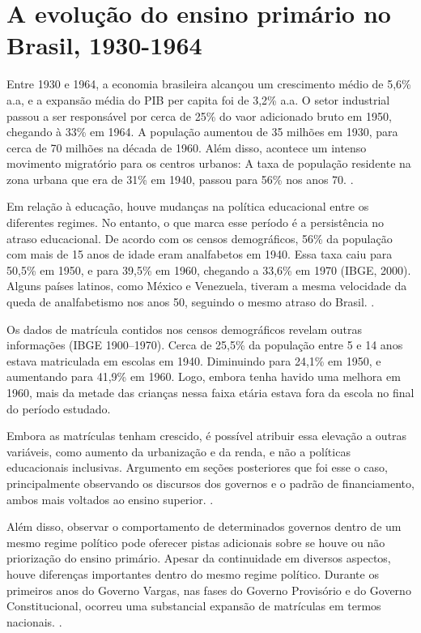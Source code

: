 \documentclass[a4paper,12pt]{article}
\begin{document}
\section*{A evolução do ensino primário no Brasil, 1930-1964}

Entre 1930 e 1964, a economia brasileira alcançou um crescimento médio de 5,6\% a.a, e a expansão média do PIB per capita foi de 3,2\% a.a.
O setor industrial passou a ser responsável por cerca de 25\% do vaor adicionado bruto em 1950, chegando à 33\% em 1964. A população aumentou de 35 milhões em 1930, para cerca de 70 milhões na década de 1960.
Além disso, acontece um intenso movimento migratório para os centros urbanos: A taxa de população residente na zona urbana que era de 31\% em 1940, passou para 56\% nos anos 70. \cite{kang}.

Em relação à educação, houve mudanças na política educacional entre os diferentes regimes. No entanto, o que marca esse período é a persistência no atraso educacional.
De acordo com os censos demográficos, 56\% da população com mais de 15 anos de idade eram analfabetos em 1940.
Essa taxa caiu para 50,5\% em 1950, e para 39,5\% em 1960, chegando a 33,6\% em 1970 (IBGE, 2000).
Alguns países latinos, como México e Venezuela, tiveram a mesma velocidade da queda de analfabetismo nos anos 50, seguindo o mesmo atraso do Brasil. \cite{frankema}.

Os dados de matrícula contidos nos censos demográficos revelam outras informações (IBGE 1900–1970). Cerca de 25,5\% da população entre 5 e 14 anos estava matriculada em escolas em 1940.
Diminuindo para 24,1\% em 1950, e aumentando para 41,9\% em 1960. Logo, embora tenha havido uma melhora em 1960, mais da metade das crianças nessa faixa etária estava fora da escola no final do período estudado.

\begin{citacao}
Embora as matrículas tenham crescido,
é possível atribuir essa elevação a outras variáveis,
como aumento da urbanização e da renda,
e não a políticas educacionais inclusivas.
Argumento em seções posteriores que foi esse o caso,
principalmente observando os discursos dos governos e o padrão de financiamento,
ambos mais voltados ao ensino superior. \cite[p. 38]{kang}.
\end{citacao}

\begin{citacao}
    Além disso,
    observar o comportamento de determinados governos dentro de um mesmo regime político pode oferecer pistas adicionais sobre se houve ou não priorização do ensino primário.
    Apesar da continuidade em diversos aspectos,
    houve diferenças importantes dentro do mesmo regime político.
    Durante os primeiros anos do Governo Vargas,
    nas fases do Governo Provisório e do Governo Constitucional,
    ocorreu uma substancial expansão de matrículas em termos nacionais.
    \cite[p. 38]{kang}.
\end{citacao}
\end{document}
